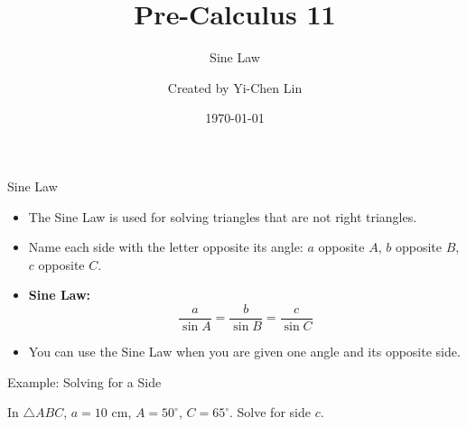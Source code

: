 \documentclass[aspectratio=169]{beamer}
\title{Pre-Calculus 11}
\subtitle{Sine Law}
\author{Created by Yi-Chen Lin}
\date{\today}
\begin{document}
\begin{frame}
    \titlepage
\end{frame}

\begin{frame}{Sine Law}
    \begin{tcolorbox}[colback=lightgray,colframe=primary,title=The Sine Law]
        \footnotesize
        \begin{itemize}
            \item The Sine Law is used for solving triangles that are not right triangles.
            \item Name each side with the letter opposite its angle: $a$ opposite $A$, $b$ opposite $B$, $c$ opposite $C$.
            \item \textbf{Sine Law:}
            \[
                \frac{a}{\sin A} = \frac{b}{\sin B} = \frac{c}{\sin C}
            \]
            \item You can use the Sine Law when you are given one angle and its opposite side.
        \end{itemize}
    \end{tcolorbox}
    
    \vspace{1em}
    \begin{center}

    \end{center}
\end{frame}

\begin{frame}{Example: Solving for a Side}
    \begin{tcolorbox}[colback=lightgray,colframe=primary,title=Question]
        \footnotesize
        In $\triangle ABC$, $a = 10$ cm, $A = 50^\circ$, $C = 65^\circ$. Solve for side $c$.
    \end{tcolorbox}
\end{frame}
\end{document}
